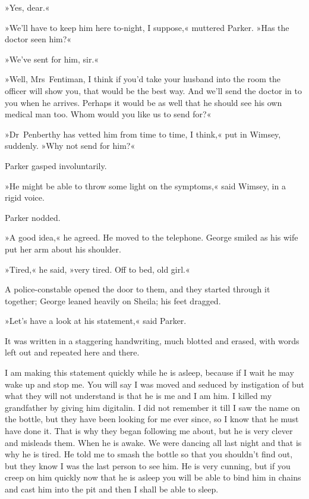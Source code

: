 »Yes, dear.«

»We'll have to keep him here to-night, I suppose,« muttered Parker. »Has the doctor seen him?«

»We've sent for him, sir.«

»Well, Mrs~Fentiman, I think if you'd take your husband into the room the officer will show you, that would be the best way. And we'll send the doctor in to you when he arrives. Perhaps it would be as well that he should see his own medical man too. Whom would you like us to send for?«

»Dr~Penberthy has vetted him from time to time, I think,« put in Wimsey, suddenly. »Why not send for him?«

Parker gasped involuntarily.

»He might be able to throw some light on the symptoms,« said Wimsey, in a rigid voice.

Parker nodded.

»A good idea,« he agreed. He moved to the telephone. George smiled as his wife put her arm about his shoulder.

»Tired,« he said, »very tired. Off to bed, old girl.«

A police-constable opened the door to them, and they started through it together; George leaned heavily on Sheila; his feet dragged.

»Let's have a look at his statement,« said Parker.

It was written in a staggering handwriting, much blotted and erased, with words left out and repeated here and there.

\begin{mail}{}{}
\noindent I am making this statement quickly while he is asleep, because if I wait he may wake up and stop me. You will say I was moved and seduced by instigation of but what they will not understand is that he is me and I am him. I killed my grandfather by giving him digitalin. I did not remember it till I saw the name on the bottle, but they have been looking for me ever since, so I know that he must have done it. That is why they began following me about, but he is very clever and misleads them. When he is awake. We were dancing all last night and that is why he is tired. He told me to smash the bottle so that you shouldn't find out, but they know I was the last person to see him. He is very cunning, but if you creep on him quickly now that he is asleep you will be able to bind him in chains and cast him into the pit and then I shall be able to sleep.

\end{mail}

